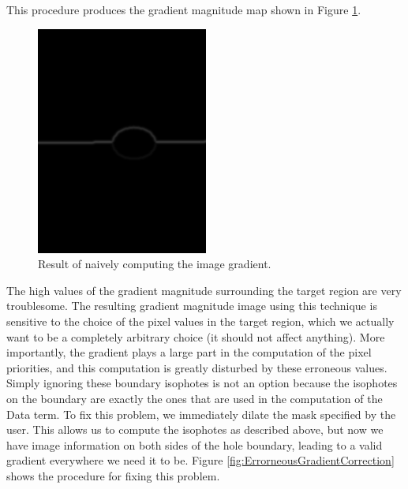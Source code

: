 \documentclass{InsightArticle}
\begin{document}
This procedure produces the gradient magnitude map shown in Figure \ref{fig:ErroneousGradient}.
\begin{figure}[H]
  \centering
  \includegraphics[width=0.3\linewidth]{images/ErroneousGradient}
  \caption{Result of naively computing the image gradient.}
  \label{fig:ErroneousGradient}
\end{figure}

The high values of the gradient magnitude surrounding the target region are very troublesome. The resulting gradient magnitude image using this technique is sensitive to the choice of the pixel values in the target region, which we actually want to be a completely arbitrary choice (it should not affect anything). More importantly, the gradient plays a large part in the computation of the pixel priorities, and this computation is greatly disturbed by these erroneous values. Simply ignoring these boundary isophotes is not an option because the isophotes on the boundary are exactly the ones that are used in the computation of the Data term. To fix this problem, we immediately dilate the mask specified by the user. This allows us to compute the isophotes as described above, but now we have image information on both sides of the hole boundary, leading to a valid gradient everywhere we need it to be. Figure \ref{fig:ErrorneousGradientCorrection} shows the procedure for fixing this problem.
\end{document}

